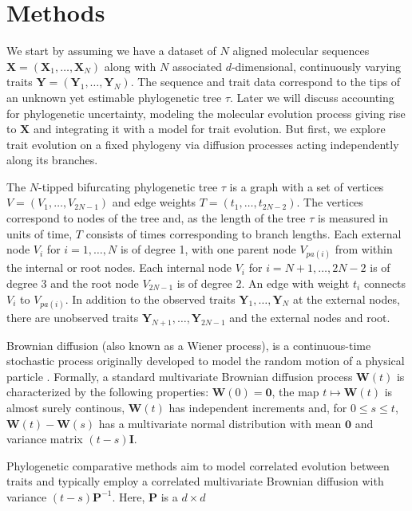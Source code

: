 \documentclass[12pt]{article}
\begin{document}
\section{Methods}

We start by assuming we have a dataset of $N$ aligned molecular sequences $\textbf{X}=(\textbf{X}_1,\dots,\textbf{X}_N)$ along with 
$N$ associated $d$-dimensional, continuously varying traits $\textbf{Y}=(\textbf{Y}_1,\dots,\textbf{Y}_N)$.  The sequence and trait data 
correspond to the tips of an unknown yet estimable phylogenetic tree $\tau$.  Later we will discuss accounting 
for phylogenetic uncertainty, modeling the molecular evolution process giving rise to $\textbf{X}$ and integrating it
with a model for trait evolution.  But first, we explore trait evolution on a fixed phylogeny via diffusion processes 
acting independently along its branches.
\par
The $N$-tipped bifurcating phylogenetic tree $\tau$ is a graph with a set of vertices
$V = (V_1,\dots,V_{2N-1})$ and edge weights $T=(t_1,\dots,t_{2N-2})$.  The vertices correspond to nodes of the tree and, as the 
length of the tree $\tau$ is measured 
in units of time, $T$ consists of times corresponding to branch lengths.
Each external node $V_i$ for $i = 1, \dots , N$ is of degree 1, with one
parent node $V_{pa(i)}$ from within the internal or root nodes.  Each internal node $V_i$ for $i = N+1, \dots , 2N-2$ 
is of degree 3 and the root node $V_{2N-1}$ is of degree 2.  An edge with weight $t_i$ connects $V_i$ to
$V_{pa(i)}$.  In addition to the observed traits $\textbf{Y}_1,\dots,\textbf{Y}_N$ at the external nodes, there are
unobserved traits $\textbf{Y}_{N+1},\dots,\textbf{Y}_{2N-1}$ and the external nodes and root.
\par
Brownian diffusion (also known as a Wiener process), is a continuous-time stochastic process originally developed to 
model the random motion of a physical particle \citep{Brown1828, Wiener1958}.  Formally, a standard multivariate Brownian diffusion process 
$\textbf{W}(t)$ is characterized by the following properties: $\textbf{W}(0) = \textbf{0}$, the map $t \mapsto \textbf{W}(t)$ is almost surely continous, 
$\textbf{W}(t)$ has
independent increments and, for $0 \leq s \leq t$, $\textbf{W}(t) - \textbf{W}(s)$ has a multivariate normal distribution with mean $\textbf{0}$ and variance
matrix $(t-s) \textbf{I}$.   
\par
Phylogenetic comparative methods aim to model correlated evolution 
between traits and typically employ a correlated multivariate Brownian diffusion with variance $(t-s)\textbf{P}^{-1}$.  Here, $\textbf{P}$ is a $d \times d$
\end{document}
